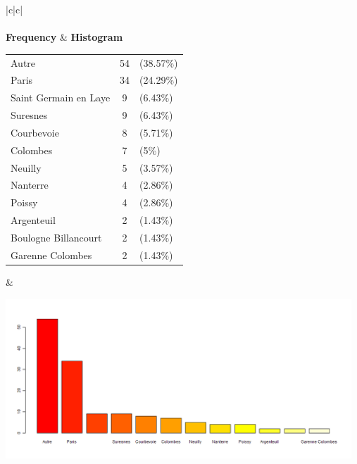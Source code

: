  
 	\begin{center}
	\addtolength{\leftskip}{-4cm}\addtolength{\rightskip}{-4cm}

\begin{tabular}{|c|c|}
\hline
{}\\

\\
\hline
 \textbf{Frequency} & \textbf{Histogram} \\

 \begin{tabular}{@{}l@{ : }cl@{}}

  Autre & 54 & (38.57\%) \\

  Paris & 34 & (24.29\%) \\

  Saint Germain en Laye & 9 & (6.43\%) \\

  Suresnes & 9 & (6.43\%) \\

  Courbevoie & 8 & (5.71\%) \\

  Colombes & 7 & (5\%) \\

  Neuilly & 5 & (3.57\%) \\

  Nanterre & 4 & (2.86\%) \\

  Poissy & 4 & (2.86\%) \\

  Argenteuil & 2 & (1.43\%) \\

  Boulogne Billancourt & 2 & (1.43\%) \\

  Garenne Colombes & 2 & (1.43\%) \\

 \end{tabular}
 & \parbox{13cm}{\includegraphics[width=13cm]{graphUniv3/V-barplot.png}}
 \\
\hline
\end{tabular}
\end{center} 
